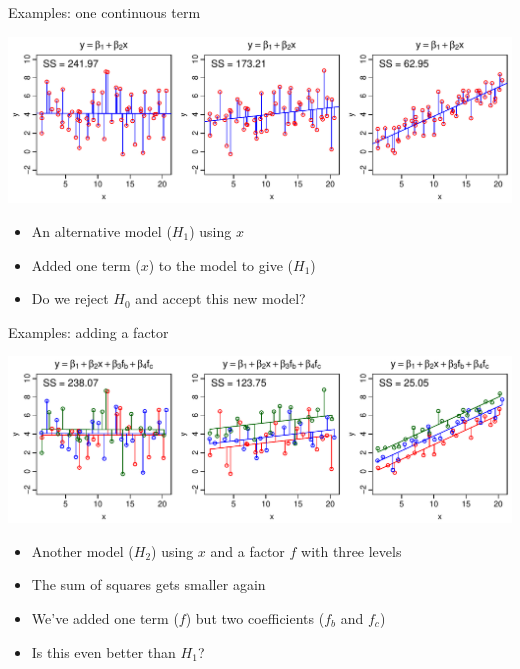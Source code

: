 \documentclass[xcolor=x11names,compress]{beamer}
\renewcommand{\(}{\begin{columns}}
\renewcommand{\)}{\end{columns}}
\newcommand{\<}[1]{\begin{column}{#1}}
\renewcommand{\>}{\end{column}}
\begin{document}

\begin{frame}{Examples: one continuous term}

\includegraphics[width=\textwidth]{ANOVA_mod.pdf}

\begin{itemize}
\item An alternative model ($H_1$) using $x$
\item Added one term ($x$) to the model to give ($H_1$)
\item Do we reject $H_0$ and accept this new model?
\end{itemize}

\end{frame}


\begin{frame}{Examples: adding a factor}

\includegraphics[width=\textwidth]{ANOVA_mod2.pdf}

\begin{itemize}
\item Another model ($H_2$) using $x$ and a factor $f$ with three levels
\item The sum of squares gets smaller again 
\item We've added one term ($f$) but two coefficients ($f_b$ and $f_c$)
\item Is this even better than $H_1$?
\end{itemize}

\end{frame}
\end{document}
